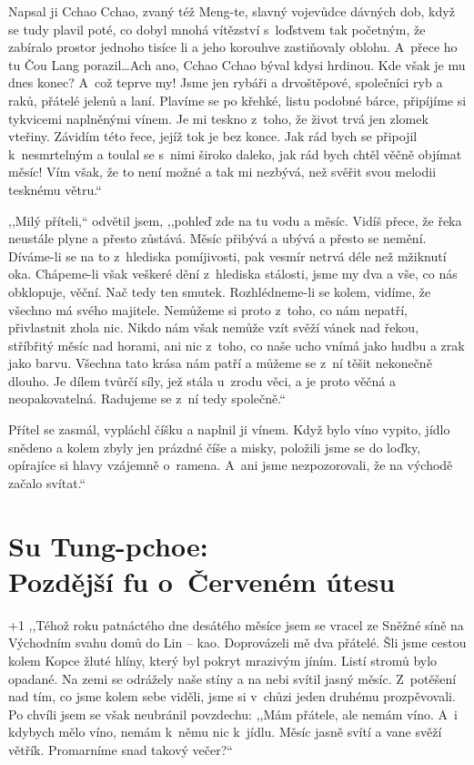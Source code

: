 \smallskip

Napsal ji Cchao Cchao, zvaný též Meng-te, slavný vojevůdce dávných dob, když se tudy plavil poté, co dobyl mnohá vítězství s loďstvem tak početným, že zabíralo prostor jednoho tisíce li a jeho korouhve zastiňovaly oblohu. A~přece ho tu Čou Lang porazil\ldots Ach ano, Cchao Cchao býval kdysi hrdinou. Kde však je mu dnes konec? A~což teprve my! Jsme jen rybáři a drvoštěpové, společníci ryb a raků, přátelé jelenů a laní. Plavíme se po křehké, listu podobné bárce, připíjíme si tykvicemi naplněnými vínem. Je mi teskno z toho, že život trvá jen zlomek vteřiny. Závidím této řece, jejíž tok je bez konce. Jak rád bych se připojil k nesmrtelným a toulal se s nimi široko daleko, jak rád bych chtěl věčně objímat měsíc! Vím však, že to není možné a tak mi nezbývá, než svěřit svou melodii tesknému větru.``

,,Milý příteli,`` odvětil jsem, ,,pohleď zde na tu vodu a měsíc. Vidíš přece, že řeka neustále  plyne a přesto zůstává. Měsíc přibývá a ubývá a přesto se nemění. Díváme-li se na to z hlediska pomíjivosti, pak vesmír netrvá déle než mžiknutí oka. Chápeme-li však veškeré dění z hlediska stálosti, jsme my dva a vše, co nás obklopuje, věční. Nač tedy ten smutek.  Rozhlédneme-li se kolem, vidíme, že všechno má svého majitele. Nemůžeme si proto z toho, co nám nepatří, přivlastnit zhola nic. Nikdo nám však nemůže vzít svěží vánek nad řekou, stříbřitý měsíc nad horami, ani nic z toho, co naše ucho vnímá jako hudbu a zrak jako barvu. Všechna tato krása nám patří a můžeme se z ní těšit nekonečně dlouho. Je dílem tvůrčí síly, jež stála u~zrodu věci, a je proto věčná a neopakovatelná. Radujeme se z ní tedy společně.``

Přítel se zasmál, vypláchl číšku a naplnil ji vínem. Když bylo víno vypito, jídlo snědeno a kolem zbyly jen prázdné číše a misky, položili jsme se do loďky, opírajíce si hlavy vzájemně o~ramena. A~ani jsme nezpozorovali, že na východě začalo svítat.``


\section{Su Tung-pchoe: \\ Pozdější fu o~Červeném útesu}

\noindent
\looseness+1 ,,Téhož roku patnáctého dne desátého měsíce jsem se vracel ze Sněžné síně na Východním svahu domů do Lin – kao. Doprovázeli mě dva přátelé. Šli jsme cestou kolem  Kopce žluté hlíny, který byl pokryt mrazivým jíním. Listí stromů bylo opadané. Na zemi se odrážely naše stíny a na nebi svítil jasný měsíc. Z potěšení nad tím, co jsme kolem sebe viděli, jsme si v chůzi jeden druhému prozpěvovali.
Po chvíli jsem se však neubránil povzdechu: ,,Mám přátele, ale nemám víno.
A~i kdybych mělo víno, nemám k němu nic k jídlu. Měsíc jasně svítí a vane svěží větřík. Promarníme snad takový večer?``

